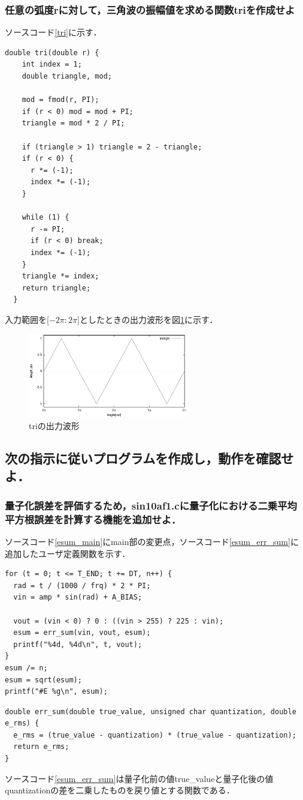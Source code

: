 \documentclass[titlepage]{jarticle}
\begin{document}
\subsubsection{任意の弧度rに対して，三角波の振幅値を求める関数triを作成せよ}
ソースコード\ref{tri}に示す．
\begin{lstlisting}[caption=double tri(double r),label=tri]
  double tri(double r) {
    int index = 1;
    double triangle, mod;

    mod = fmod(r, PI);
    if (r < 0) mod = mod + PI;
    triangle = mod * 2 / PI;

    if (triangle > 1) triangle = 2 - triangle;
    if (r < 0) {
      r *= (-1);
      index *= (-1);
    }

    while (1) {
      r -= PI;
      if (r < 0) break;
      index *= (-1);
    }
    triangle *= index;
    return triangle;
  }
\end{lstlisting}

入力範囲を[$-2\pi:2\pi$]としたときの出力波形を図\ref{fig:tri}に示す．
\begin{figure}[H]
  \centering
  \includegraphics[width=7cm]{EPS/tri.eps}
  \caption{triの出力波形}
  \label{fig:tri}
\end{figure}

\subsection{次の指示に従いプログラムを作成し，動作を確認せよ．}
\setcounter{subsubsection}{2}
\subsubsection{量子化誤差を評価するため，sin10af1.cに量子化における二乗平均平方根誤差を計算する機能を追加せよ．}
ソースコード\ref{esum_main}にmain部の変更点，ソースコード\ref{esum_err_sum}に追加したユーザ定義関数を示す．

\begin{lstlisting}[caption=esumに関係するmain部の変更点,label=esum_main]
for (t = 0; t <= T_END; t += DT, n++) {
  rad = t / (1000 / frq) * 2 * PI;
  vin = amp * sin(rad) + A_BIAS;

  vout = (vin < 0) ? 0 : ((vin > 255) ? 225 : vin);
  esum = err_sum(vin, vout, esum);
  printf("%4d, %4d\n", t, vout);
}
esum /= n;
esum = sqrt(esum);
printf("#E %g\n", esum);
\end{lstlisting}
\begin{lstlisting}[caption=double err\_sum(double{,}unsigned char{,}double),label=esum_err_sum]
double err_sum(double true_value, unsigned char quantization, double e_rms) {
  e_rms = (true_value - quantization) * (true_value - quantization);
  return e_rms;
}
\end{lstlisting}
ソースコード\ref{esum_err_sum}は量子化前の値true\_valueと量子化後の値quantizationの差を二乗したものを戻り値とする関数である．
\end{document}
